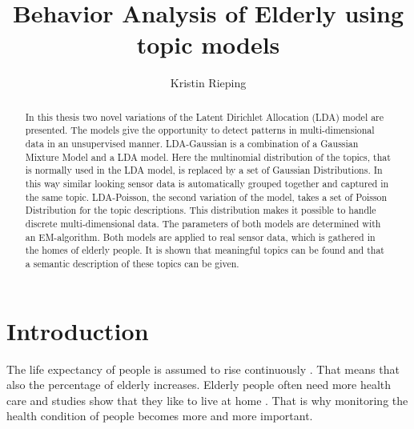 \documentclass[11pt,a4paper]{article}
\title{Behavior Analysis of Elderly using topic models}
\author{Kristin Rieping}
\begin{document}
\maketitle
\pagebreak
\tableofcontents
\pagebreak

\begin{abstract}
In this thesis two novel variations of the Latent Dirichlet Allocation (LDA) model are presented. The models give the opportunity to detect patterns in multi-dimensional data in an unsupervised manner. LDA-Gaussian is a combination of a Gaussian Mixture Model and a LDA model. Here the multinomial distribution of the topics, that is normally used in the LDA model, is replaced by a set of Gaussian Distributions. In this way similar looking sensor data is automatically grouped together and captured in the same topic.
LDA-Poisson, the second variation of the model, takes a set of Poisson Distribution for the topic descriptions. This distribution makes it possible to handle discrete multi-dimensional data. The parameters of both models are determined with an EM-algorithm.
Both models are applied to real sensor data, which is gathered in the homes of elderly people. It is shown that meaningful topics can be found and that a semantic description of these topics can be given.


\end{abstract}


\section{Introduction}
The life expectancy of people is assumed to rise continuously \cite{4864}. That means that also the percentage of elderly increases. Elderly people often need more health care and studies show that they like to live at home \cite{Cavallo:1315167} . That is why monitoring the health condition of people becomes more and more important.\\
\end{document}
